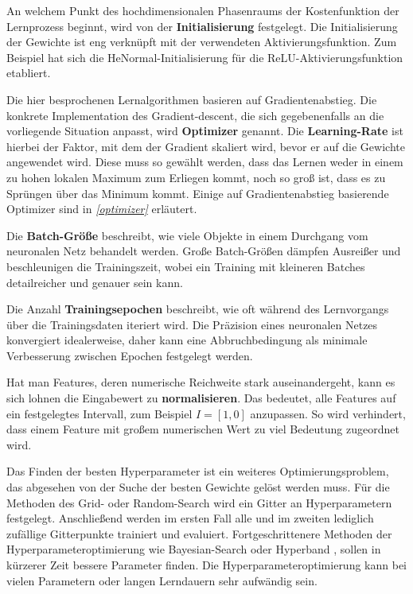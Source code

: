 An welchem Punkt des hochdimensionalen Phasenraums der Kostenfunktion der Lernprozess beginnt, wird von der \textbf{Initialisierung} festgelegt. Die Initialisierung der Gewichte ist eng verknüpft mit der verwendeten Aktivierungsfunktion. Zum Beispiel hat sich die HeNormal-Initialisierung \cite{He} für die ReLU-Aktivierungsfunktion etabliert.

Die hier besprochenen Lernalgorithmen basieren auf Gradientenabstieg. Die konkrete Implementation des Gradient-descent, die sich gegebenenfalls an die vorliegende Situation anpasst, wird \textbf{Optimizer} genannt. Die \textbf{Learning-Rate} ist hierbei der Faktor, mit dem der Gradient skaliert wird, bevor er auf die Gewichte angewendet wird. Diese muss so gewählt werden, dass das Lernen weder in einem zu hohen lokalen Maximum zum Erliegen kommt, noch so groß ist, dass es zu Sprüngen über das Minimum kommt. Einige auf Gradientenabstieg basierende Optimizer sind in \textit{\autoref{optimizer}} erläutert.

Die \textbf{Batch-Größe} beschreibt, wie viele Objekte in einem Durchgang vom neuronalen Netz behandelt werden. Große Batch-Größen dämpfen Ausreißer und beschleunigen die Trainingszeit, wobei ein Training mit kleineren Batches detailreicher und genauer sein kann. 

Die Anzahl \textbf{Trainingsepochen} beschreibt, wie oft während des Lernvorgangs über die Trainingsdaten iteriert wird. Die Präzision eines neuronalen Netzes konvergiert idealerweise, daher kann eine Abbruchbedingung als minimale Verbesserung zwischen Epochen festgelegt werden. 

Hat man Features, deren numerische Reichweite stark auseinandergeht, kann es sich lohnen die Eingabewert zu \textbf{normalisieren}. Das bedeutet, alle Features auf ein festgelegtes Intervall, zum Beispiel $I=[1,0]$ anzupassen. So wird verhindert, dass einem Feature mit großem numerischen Wert zu viel Bedeutung zugeordnet wird.

\label{random-search}
Das Finden der besten Hyperparameter ist ein weiteres Optimierungsproblem, das abgesehen von der Suche der besten Gewichte gelöst werden muss. Für die Methoden des Grid- oder Random-Search wird ein Gitter an Hyperparametern festgelegt. Anschließend werden im ersten Fall alle und im zweiten lediglich zufällige Gitterpunkte trainiert und evaluiert. Fortgeschrittenere Methoden der Hyperparameteroptimierung wie Bayesian-Search \cite{bayesian} oder Hyperband \cite{hyperband}, sollen in kürzerer Zeit bessere Parameter finden. Die Hyperparameteroptimierung kann bei vielen Parametern oder langen Lerndauern sehr aufwändig sein. 

